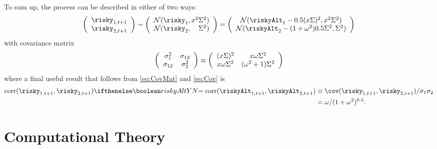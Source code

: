 To sum up, the process can be described in either of two ways:
\begin{equation*}
 \left(\begin{array}{c}\risky_{1,t+1} \\ \risky_{2,t+1} \end{array}\right) \sim \left(\begin{array}{c}\mathcal{N}(\risky_{1},\scale^{2} \sigAll^{2}) \\ \mathcal{N}(\risky_{2}, \phantom{\scale^{2}} \sigAll^{2}) \end{array}\right) = \left(\begin{array}{c}\mathcal{N}(\riskyAlt_{1}-0.5(\scale\sigAll)^{2},\scale^{2} \sigAll^{2}) \\ \mathcal{N}(\riskyAlt_{2} - (1+\omega^{2})0.5 \sigAll^{2}, \sigAll^{2}) \end{array}\right)
\end{equation*}
with covariance matrix
\begin{equation}
\left(\begin{array}{ccc}\sigma_1^2 & \sigma_{12} \\ \sigma_{12}& \sigma_2^2\end{array}\right) \equiv \left(\begin{array}{ccc}(x \Sigma)^2 & x \omega \Sigma^{2} \\ x \omega \Sigma^{2}  & (\omega^{2}+1)\Sigma^{2}\end{array}\right) \label{eq:CovMat}
\end{equation}
where a final useful result that follows from \eqref{eq:CovMat} and \eqref{eq:Cov} is
\begin{equation}\begin{gathered}\begin{aligned}
 \text{corr}({\risky}_{1,t+1} ,{\risky}_{2,t+1}) \ifriskyAlt{= \text{corr}(\riskyAlt_{1,t+1} ,\riskyAlt_{2,t+1})}{} & \equiv  \cov({\risky}_{1,t+1} ,{\risky}_{2,t+1})/\sigma_{1}\sigma_{2}
\\ & =  \omega/(1+\omega^{2})^{0.5} .
\end{aligned}\end{gathered}\end{equation}

\section{Computational Theory}

